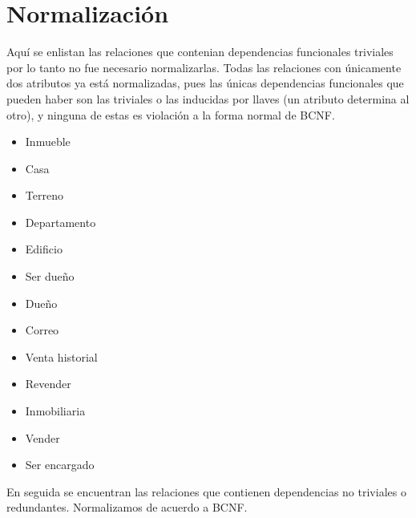 \documentclass[10pt]{article}
\begin{document}
    \section{Normalización}
    
    Aquí se enlistan las relaciones que contenian dependencias funcionales triviales por lo tanto no fue necesario normalizarlas. 
    Todas las relaciones con únicamente dos atributos ya está normalizadas, pues las
    únicas dependencias funcionales que pueden haber son las triviales o las inducidas
    por llaves (un atributo determina al otro), y ninguna de estas es violación a la forma normal de BCNF.
    \begin{itemize}
    	\item Inmueble
    	\item Casa
    	\item Terreno
    	\item Departamento
    	\item Edificio
    	\item Ser dueño
    	\item Dueño
    	\item Correo 
    	\item Venta historial
    	\item Revender
    	\item Inmobiliaria
    	\item Vender
    	\item Ser encargado
    \end{itemize}
    
    En seguida se encuentran las relaciones que contienen dependencias no triviales o redundantes. Normalizamos de acuerdo a BCNF.
    
\end{document}
